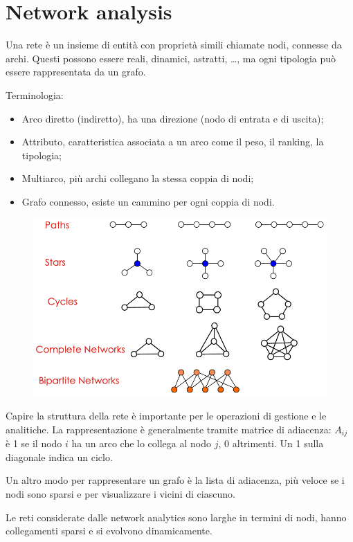 \section{Network analysis}
Una rete è un insieme di entità con proprietà simili chiamate nodi, connesse da archi. Questi possono essere reali, dinamici, astratti, \dots, ma ogni tipologia può essere rappresentata da un grafo. 

Terminologia:
\begin{itemize}
	\item Arco diretto (indiretto), ha una direzione (nodo di entrata e di uscita);
	\item Attributo, caratteristica associata a un arco come il peso, il ranking, la tipologia;
	\item Multiarco, più archi collegano la stessa coppia di nodi;
	\item Grafo connesso, esiste un cammino per ogni coppia di nodi.
\end{itemize}

\begin{figure}[h]
	\centering
	\includegraphics[scale=0.52]{Lezioni/Immagini/network}
\end{figure}

Capire la struttura della rete è importante per le operazioni di gestione e le analitiche. La rappresentazione è generalmente tramite matrice di adiacenza: $A_{ij}$ è 1 se il nodo $i$ ha un arco che lo collega al nodo $j$, 0 altrimenti. Un 1 sulla diagonale indica un ciclo.

Un altro modo per rappresentare un grafo è la lista di adiacenza, più veloce se i nodi sono sparsi e per visualizzare i vicini di ciascuno.

Le reti considerate dalle network analytics sono larghe in termini di nodi, hanno collegamenti sparsi e si evolvono dinamicamente. 

